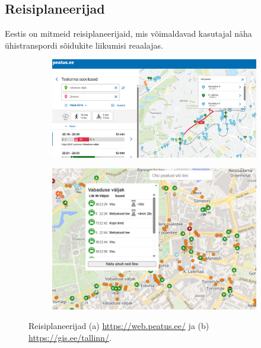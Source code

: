 \subsection{Reisiplaneerijad}

Eestis on mitmeid reisiplaneerijaid, mis võimaldavad kasutajal näha ühistranspordi sõidukite liikumisi reaalajas. 

\begin{figure}[h!]
    \centering
    \begin{subfigure}{0.45\textwidth}
        \centering
        \includegraphics[width=\textwidth]{figures/peatus.png}
        \caption{}
        \label{fig:Peatus.ee}
    \end{subfigure}
    \hfill
    \begin{subfigure}{0.45\textwidth}
        \centering
        \includegraphics[width=\textwidth]{figures/gis.png}
        \caption{}
        \label{fig:https://gis.ee/tallinn/}
    \end{subfigure}
    \caption{Reisiplaneerijad (a) \url{https://web.peatus.ee/} ja (b) \url{https://gis.ee/tallinn/}.}
    \label{fig:combined}
\end{figure}

